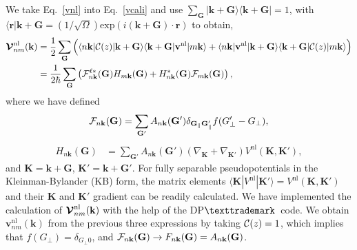 \documentclass[floatfix,prb,aps,superscriptaddress,showpacs,11pt,preprint,letterpaper]{revtex4}
\begin{document}
We take Eq.~\eqref{vnl} into Eq.~\eqref{vcali}
and use
$\sum_{\mathbf{G}} | \mathbf{k}+\mathbf{G}\rangle \langle\mathbf{k}+\mathbf{G} | =1$, 
with
$\langle\mathbf{r}|\mathbf{k}+\mathbf{G}=(1/\sqrt{\Omega})
\mathrm{exp}(i(\mathbf{k}+\mathbf{G})\cdot\mathbf{r})$
to obtain,
\begin{align}\label{vnl.5}
\boldsymbol{\mathcal{\cal V}}^{\mathrm{nl}}_{nm}(\mathbf{k})&=\frac{1}{2}
\sum_{\mathbf{G}}
\Big(
\langle n\mathbf{k} | {\mathbf{\cal C}}(z) 
| \mathbf{k}+\mathbf{G}\rangle\langle\mathbf{k}+\mathbf{G} |
\mathbf{v}^\mathrm{nl} | m\mathbf{k}\rangle
+
\langle n\mathbf{k} |
\mathbf{v}^\mathrm{nl}  
| \mathbf{k}+\mathbf{G}\rangle\langle\mathbf{k}+\mathbf{G} |
{\mathbf{\cal C}}(z) | m\mathbf{k}\rangle
\Big)
\nonumber\\
&=\frac{1}{2 \hbar}
\sum_{\mathbf{G}}
\left(
{\mathbf{\cal F}}^{\ell*}_{n\mathbf{k}}(\mathbf{G}) 
H_{m\mathbf{k}}(\mathbf{G}) 
+
H^*_{n\mathbf{k}}(\mathbf{G}) 
{\mathbf{\cal F}}_{m\mathbf{k}}(\mathbf{G}) 
\right) 
,
\end{align}  
where 
we have defined  
\begin{align}\label{vnl.10}
{\mathbf{\cal F}}_{n\mathbf{k}}(\mathbf{G}) 
=
\sum_{\mathbf{G}'} 
A_{n\mathbf{k}}(\mathbf{G}') 
\delta_{\mathbf{G}_\parallel \mathbf{G}'_\parallel}f(G'_\perp-G_\perp) 
,
\end{align} 
\begin{align}\label{vnl.11}
H_{n\mathbf{k}}(\mathbf{G})&=
\sum_{\mathbf{G}'} 
A_{n\mathbf{k}}(\mathbf{G}') 
(\nabla_{\mathbf{K}}+\nabla_{\mathbf{K}'})  
V^\mathrm{nl}(\mathbf{K},\mathbf{K}')
,
\end{align}
and $\mathbf{K}=\mathbf{k}+\mathbf{G}$, $\mathbf{K}'=\mathbf{k}+\mathbf{G}'$.
For fully  separable pseudopotentials in the   
Kleinman-Bylander (KB) form,\cite{mottaCMS10,kleinmanPRL82,adolphPRB96}  
the  
matrix elements 
 $\langle\mathbf{K} |
V^\mathrm{nl}  
| \mathbf{K}'\rangle
=V^\mathrm{nl}(\mathbf{K},\mathbf{K}')  
$ 
and their $\mathbf{K}$ and $\mathbf{K}'$ gradient 
can be readily calculated.\cite{mottaCMS10,adolphPRB96,gordienkoRPJ04,fuchsCPC99} 
We have 
implemented 
the calculation of $\boldsymbol{\mathcal{\cal V}}^{\mathrm{nl}}_{nm}(\mathbf{k})$ with the help of 
the DP${\texttrademark}$~code.\cite{francesco}
We obtain $\mathbf{v}^{\mathrm{nl}}_{nm}(\mathbf{k})$ from the previous three 
expressions by taking ${\mathbf{\cal C}}(z)=1$, which implies 
that $f(G_\perp)=\delta_{G_\perp 0}$, 
and 
${\mathbf{\cal F}}_{n\mathbf{k}}(\mathbf{G}) \to F_{n\mathbf{k}}(\mathbf{G})=A_{n\mathbf{k}}(\mathbf{G})$.
\end{document}
